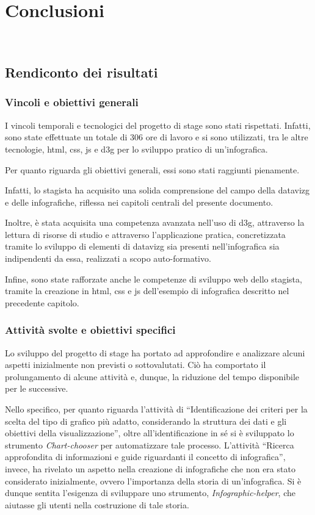 \chapter{Conclusioni}
\label{cap:conclusioni}
\\

\section{Rendiconto dei risultati}
\subsection{Vincoli e obiettivi generali}
I vincoli temporali e tecnologici del progetto di stage sono stati rispettati. 
Infatti, sono state effettuate un totale di 306 ore di lavoro e si sono utilizzati, tra le altre tecnologie, 
\gls{html}, \gls{css}, \gls{js} e \gls{d3g} per lo sviluppo pratico di un'infografica.

\bigskip
\noindent Per quanto riguarda gli obiettivi generali, essi sono stati raggiunti pienamente.

Infatti, lo stagista ha acquisito una solida comprensione del campo 
della \gls{datavizg} e delle infografiche, riflessa nei capitoli centrali del presente documento. 

Inoltre, è stata acquisita una competenza avanzata nell'uso di \gls{d3g}, attraverso la lettura di risorse di studio e 
attraverso l'applicazione pratica, concretizzata tramite lo sviluppo di elementi di \gls{datavizg} sia presenti nell'infografica sia  
indipendenti da essa, realizzati a scopo auto-formativo.

Infine, sono state rafforzate anche le competenze di sviluppo web dello stagista, tramite la creazione in \gls{html}, \gls{css} e \gls{js} dell'esempio di infografica 
descritto nel precedente capitolo.

\subsection{Attività svolte e obiettivi specifici}
Lo sviluppo del progetto di stage ha portato ad approfondire e analizzare alcuni aspetti inizialmente non previsti o sottovalutati. 
Ciò ha comportato il prolungamento di alcune attività e, dunque, la riduzione del tempo disponibile per le successive.

Nello specifico, per quanto riguarda l'attività di ``Identificazione dei criteri per la scelta del tipo di grafico più adatto, considerando la struttura dei
dati e gli obiettivi della visualizzazione'', oltre all'identificazione in sé si è sviluppato lo strumento \emph{Chart-chooser} per automatizzare tale processo. 
L'attività ``Ricerca approfondita di informazioni e guide riguardanti il concetto di infografica'', invece, ha rivelato un aspetto nella creazione di infografiche che 
non era stato considerato inizialmente, ovvero l'importanza della storia di un'infografica. Si è dunque sentita l'esigenza di sviluppare uno strumento, 
\emph{Infographic-helper}, che aiutasse gli utenti nella costruzione di tale storia.

